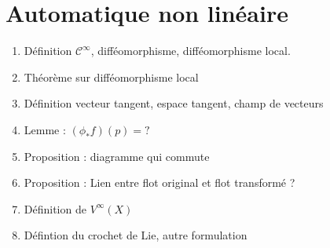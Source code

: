 \documentclass{article}
\begin{document}
\part{Automatique non lin\'{e}aire}
\begin{enumerate}
\section{Outils mathématiques}
	\item Définition $\mathcal{C}^{\infty}$, difféomorphisme, difféomorphisme local.
	\item Théorème sur difféomorphisme local
	\item Définition vecteur tangent, espace tangent, champ de vecteurs
	\item Lemme : $(\phi_*f)(p)=?$
	\item Proposition : diagramme qui commute
	\item Proposition : Lien entre flot original et flot transformé ?
	\item Définition de $V^{\infty}(X)$
	\item Défintion du crochet de Lie, autre formulation

\end{enumerate}
\end{document}
